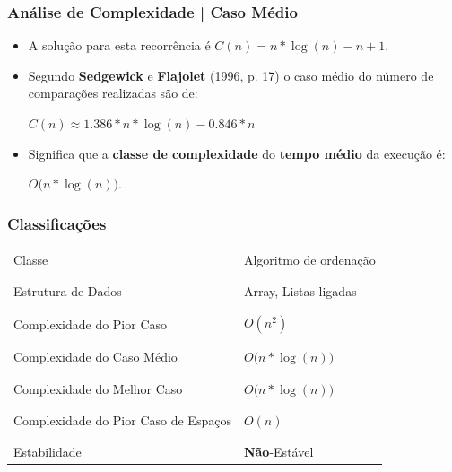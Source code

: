 \documentclass[
	11pt, %
]{beamer}
\begin{document}
\begin{frame}
	\frametitle{Análise de Complexidade | Caso Médio}
	
	{\small
		\begin{itemize}
			\item A solução para esta recorrência é $C(n) = n*\log(n) - n + 1$.
			\item Segundo \textbf{Sedgewick} e \textbf{Flajolet} (1996, p. 17) o caso médio do número de comparações realizadas são de: 
		
			\begin{center}
			$C(n) \approx 1.386 * n*\log(n) - 0.846*n$
			\end{center}
	
			\item Significa que a \textbf{classe de complexidade} do \textbf{tempo médio} da execução é:
			\begin{center}
			$O\bigg(n*\log(n)\bigg)$.
			\end{center}
		\end{itemize}
	}
\end{frame}

\begin{frame}
	\frametitle{Classificações}
	{\tiny
	\begin{table}[]
		\begin{tabular}{l|l}
			Classe & Algoritmo de ordenação \\
			\\ \hline \\
			Estrutura de Dados & Array, Listas ligadas \\
			\\ \hline \\
			Complexidade do Pior Caso & $O(n^{2})$ \\
			\\ \hline \\
			Complexidade do Caso Médio & $O\bigg(n*\log(n)\bigg)$ \\
			\\ \hline \\
			Complexidade do Melhor Caso & $O\bigg(n*\log(n)\bigg)$ \\
			\\ \hline \\
			Complexidade do Pior Caso de Espaços & $O(n)$ \\ 
			\\ \hline \\
			Estabilidade & \textbf{Não}-Estável
		\end{tabular}
	\end{table}
	}
\end{frame}
\end{document}
